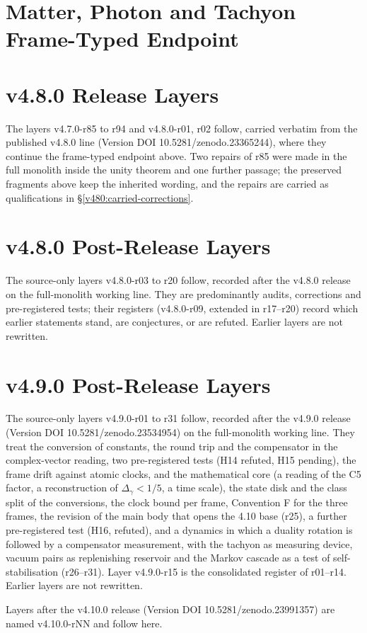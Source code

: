 \section{Matter, Photon and Tachyon Frame-Typed Endpoint}
\label{v480:support-frames}


\section{v4.8.0 Release Layers}
\label{v480:support-release-layers}


The layers v4.7.0-r85 to r94 and v4.8.0-r01, r02 follow, carried verbatim from the
published v4.8.0 line (Version DOI 10.5281/zenodo.23365244), where they continue the
frame-typed endpoint above.  Two repairs of r85 were made in the full monolith inside
the unity theorem and one further passage; the preserved fragments above keep the
inherited wording, and the repairs are carried as qualifications in
\S\ref{v480:carried-corrections}.


\section{v4.8.0 Post-Release Layers}
\label{v480:support-post-release-layers}
The source-only layers v4.8.0-r03 to r20 follow, recorded after the v4.8.0 release on
the full-monolith working line.  They are predominantly audits, corrections and
pre-registered tests; their registers (v4.8.0-r09, extended in r17--r20) record which
earlier statements stand, are conjectures, or are refuted.  Earlier layers are not
rewritten.


\section{v4.9.0 Post-Release Layers}
\label{v490:support-post-release-layers}
The source-only layers v4.9.0-r01 to r31 follow, recorded after the v4.9.0 release
(Version DOI 10.5281/zenodo.23534954) on the full-monolith working line.  They treat the
conversion of constants, the round trip and the compensator in the complex-vector reading,
two pre-registered tests (H14 refuted, H15 pending), the frame drift against atomic clocks,
and the mathematical core (a reading of the C5 factor, a reconstruction of
\(\Delta_\gamma<1/5\), a time scale), the state disk and the class split of the conversions, the clock bound per frame,
Convention F for the three frames, the revision of the main body that opens the 4.10 base (r25), a further pre-registered test (H16, refuted),
and a dynamics in which a duality rotation is followed by a compensator measurement, with the tachyon as
measuring device, vacuum pairs as replenishing reservoir and the Markov cascade as a test of self-stabilisation (r26--r31).
Layer v4.9.0-r15 is the consolidated register of r01--r14.
Earlier layers are not rewritten.

Layers after the v4.10.0 release (Version DOI 10.5281/zenodo.23991357) are named v4.10.0-rNN and follow here.

